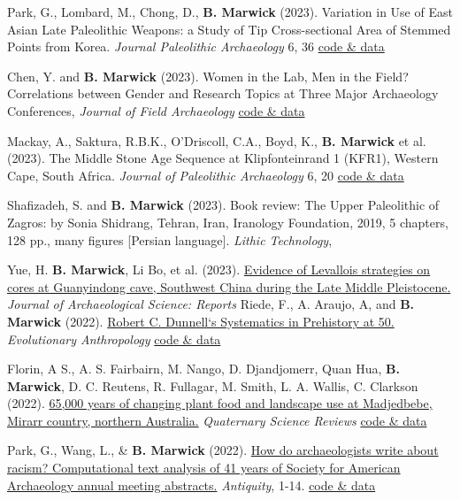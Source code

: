 \documentclass[11pt,article,oneside]{memoir}
\begin{document}

\ind Park, G., Lombard, M., Chong, D., \textbf{B. Marwick} (2023). Variation in Use of East Asian Late Paleolithic Weapons: a Study of Tip Cross-sectional Area of Stemmed Points from Korea. \textit{Journal Paleolithic Archaeology} 6, 36 \href{https://doi.org/10.17605/osf.io/dqna8}{code \& data}

\ind Chen, Y. and \textbf{B. Marwick} (2023). Women in the Lab, Men in the Field? Correlations between Gender and Research Topics at Three Major Archaeology Conferences, \textit{Journal of Field Archaeology} \href{https://doi.org/10.17605/OSF.IO/ZFB36}{code \& data}

\ind Mackay, A., Saktura, R.B.K., O’Driscoll, C.A., Boyd, K., \textbf{B. Marwick} et al. (2023). The Middle Stone Age Sequence at Klipfonteinrand 1 (KFR1), Western Cape, South Africa. \textit{Journal of Paleolithic Archaeology} 6, 20 \href{http://doi.org/10.17605/OSF.IO/JBPFW}{code \& data}

\ind Shafizadeh, S. and \textbf{B. Marwick} (2023). Book review: The Upper Paleolithic of Zagros: by Sonia Shidrang, Tehran, Iran, Iranology Foundation, 2019, 5 chapters, 128 pp., many figures [Persian language]. \textit{Lithic Technology},

\ind  Yue, H. \textbf{B. Marwick}, Li Bo, et al. (2023). \href{https://doi.org/10.1016/j.jasrep.2022.103727}{Evidence of Levallois strategies on cores at Guanyindong cave, Southwest China during the Late Middle Pleistocene.} \textit{Journal of Archaeological Science: Reports} 
\ind Riede, F., A. Araujo, A, and \textbf{B. Marwick} (2022). \href{http://doi.org/10.1017/ehs.2022.18}{Robert C. Dunnell`s Systematics in Prehistory at 50.} \textit{Evolutionary Anthropology} \href{http://doi.org/10.17605/OSF.IO/JBPFW}{code \& data}

\ind Florin, A S., A. S. Fairbairn, M. Nango, D. Djandjomerr, Quan Hua, \textbf{B. Marwick}, D. C. Reutens, R. Fullagar, M. Smith, L. A. Wallis, C. Clarkson (2022). \href{https://doi.org/10.1016/j.quascirev.2022.107498}{65,000 years of changing plant food and landscape use at Madjedbebe, Mirarr country, northern Australia.} \textit{Quaternary Science Reviews} \href{http://doi.org/10.17605/OSF.IO/KPH5Z}{code \& data}

\ind Park, G., Wang, L., \& \textbf{B. Marwick} (2022). \href{https://doi.org/10.15184/aqy.2021.181}{How do archaeologists write about racism? Computational text analysis of 41 years of Society for American Archaeology annual meeting abstracts.} \textit{Antiquity}, 1-14. \href{http://doi.org/10.17605/OSF.IO/2N3RF}{code \& data}
\end{document}
